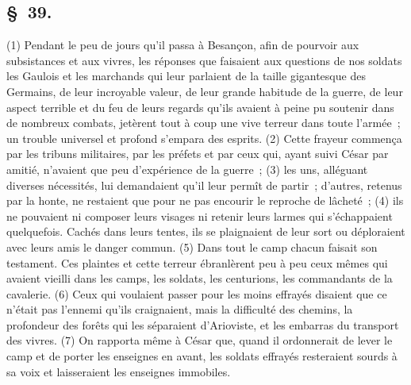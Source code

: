 \documentclass[french,twoside]{book} %
\begin{document}
\subsection[{§ 39.}]{ \textsc{§ 39.} }
\noindent (1) Pendant le peu de jours qu’il passa à Besançon, afin de pourvoir aux subsistances et aux vivres, les réponses que faisaient aux questions de nos soldats les Gaulois et les marchands qui leur parlaient de la taille gigantesque des Germains, de leur incroyable valeur, de leur grande habitude de la guerre, de leur aspect terrible et du feu de leurs regards qu’ils avaient à peine pu soutenir dans de nombreux combats, jetèrent tout à coup une vive terreur dans toute l’armée ; un trouble universel et profond s’empara des esprits. (2) Cette frayeur commença par les tribuns militaires, par les préfets et par ceux qui, ayant suivi César par amitié, n’avaient que peu d’expérience de la guerre ; (3) les uns, alléguant diverses nécessités, lui demandaient qu’il leur permît de partir ; d’autres, retenus par la honte, ne restaient que pour ne pas encourir le reproche de lâcheté ; (4) ils ne pouvaient ni composer leurs visages ni retenir leurs larmes qui s’échappaient quelquefois. Cachés dans leurs tentes, ils se plaignaient de leur sort ou déploraient avec leurs amis le danger commun. (5) Dans tout le camp chacun faisait son testament. Ces plaintes et cette terreur ébranlèrent peu à peu ceux mêmes qui avaient vieilli dans les camps, les soldats, les centurions, les commandants de la cavalerie. (6) Ceux qui voulaient passer pour les moins effrayés disaient que ce n’était pas l’ennemi qu’ils craignaient, mais la difficulté des chemins, la profondeur des forêts qui les séparaient d’Arioviste, et les embarras du transport des vivres. (7) On rapporta même à César que, quand il ordonnerait de lever le camp et de porter les enseignes en avant, les soldats effrayés resteraient sourds à sa voix et laisseraient les enseignes immobiles.
\end{document}
